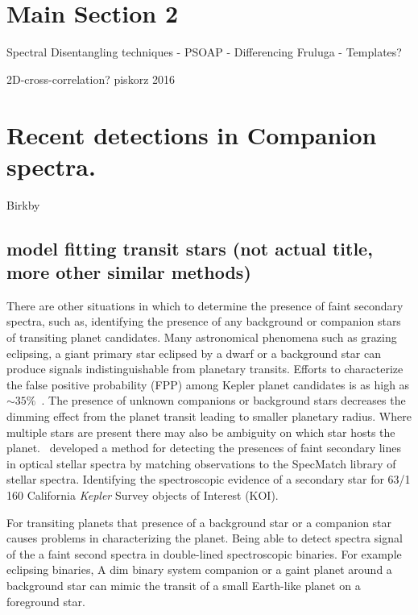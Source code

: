 
\section{Main Section 2}


Spectral Disentangling techniques
- PSOAP
- Differencing Fruluga
- Templates?


2D-cross-correlation?   piskorz 2016


\section{Recent detections in Companion spectra.}


Birkby


\subsection{model fitting transit stars (not actual title, more other similar methods)}
There are other situations in which to determine the presence of faint secondary spectra, such as, identifying the presence of any background or companion stars of transiting planet candidates. Many astronomical phenomena such as grazing eclipsing, a giant primary star eclipsed by a dwarf or a background star can produce signals indistinguishable from planetary transits. Efforts to characterize the false positive probability (FPP) among Kepler planet candidates is as high as $\sim35\%$~\citep{santerne_sophie_2012}. The presence of unknown companions or background stars decreases the dimming effect from the planet transit leading to smaller planetary radius. Where multiple stars are present there may also be ambiguity on which star hosts the planet.~\citet{kolbl_detection_2015} developed a method for detecting the presences of faint secondary lines in optical stellar spectra by matching observations to the SpecMatch library of stellar spectra. Identifying the spectroscopic evidence of a secondary star for 63/1\,160 California \emph{Kepler} Survey objects of Interest (KOI).


For transiting planets that presence of a background star or a companion star causes problems in characterizing the planet. Being able to detect spectra signal of the a faint second spectra in double-lined spectroscopic binaries.
For example eclipsing binaries,
A dim binary system companion or a gaint planet around a background star can mimic the transit of a small Earth-like planet on a foreground star.






